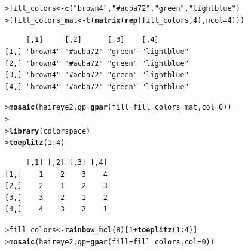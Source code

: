 \documentclass[10pt,krantz2]{krantz}\usepackage[]{graphicx}\usepackage[]{color}
\makeatletter
\newcommand{\hlnum}[1]{\textcolor[rgb]{0.686,0.059,0.569}{#1}}%
\newcommand{\hlstr}[1]{\textcolor[rgb]{0.192,0.494,0.8}{#1}}%
\newcommand{\hlopt}[1]{\textcolor[rgb]{0,0,0}{#1}}%
\newcommand{\hlstd}[1]{\textcolor[rgb]{0.345,0.345,0.345}{#1}}%
\newcommand{\hlkwb}[1]{\textcolor[rgb]{0.69,0.353,0.396}{#1}}%
\newcommand{\hlkwc}[1]{\textcolor[rgb]{0.333,0.667,0.333}{#1}}%
\newcommand{\hlkwd}[1]{\textcolor[rgb]{0.737,0.353,0.396}{\textbf{#1}}}%
\newenvironment{kframe}{%
 \def\at@end@of@kframe{}%
 \ifinner\ifhmode%
  \def\at@end@of@kframe{\end{minipage}}%
  \begin{minipage}{\columnwidth}%
 \fi\fi%
 \def\FrameCommand##1{\hskip\@totalleftmargin \hskip-\fboxsep
 \colorbox{shadecolor}{##1}\hskip-\fboxsep
     \hskip-\linewidth \hskip-\@totalleftmargin \hskip\columnwidth}%
 \MakeFramed {\advance\hsize-\width
   \@totalleftmargin\z@ \linewidth\hsize
   \@setminipage}}%
 {\par\unskip\endMakeFramed%
 \at@end@of@kframe}
\newenvironment{knitrout}{}{} %
\renewenvironment{knitrout}{\small\renewcommand{\baselinestretch}{.85}}{} %
\makeatother
\begin{document}
\begin{knitrout}
\color{fgcolor}\begin{kframe}
\begin{alltt}
\hlstd{> }\hlstd{fill_colors} \hlkwb{<-} \hlkwd{c}\hlstd{(}\hlstr{"brown4"}\hlstd{,} \hlstr{"#acba72"}\hlstd{,} \hlstr{"green"}\hlstd{,} \hlstr{"lightblue"}\hlstd{)}
\hlstd{> }\hlstd{(fill_colors_mat} \hlkwb{<-} \hlkwd{t}\hlstd{(}\hlkwd{matrix}\hlstd{(}\hlkwd{rep}\hlstd{(fill_colors,} \hlnum{4}\hlstd{),} \hlkwc{ncol}\hlstd{=}\hlnum{4}\hlstd{)))}
\end{alltt}
\begin{verbatim}
     [,1]     [,2]      [,3]    [,4]       
[1,] "brown4" "#acba72" "green" "lightblue"
[2,] "brown4" "#acba72" "green" "lightblue"
[3,] "brown4" "#acba72" "green" "lightblue"
[4,] "brown4" "#acba72" "green" "lightblue"
\end{verbatim}
\begin{alltt}
\hlstd{> }\hlkwd{mosaic}\hlstd{(haireye2,} \hlkwc{gp} \hlstd{=} \hlkwd{gpar}\hlstd{(}\hlkwc{fill} \hlstd{= fill_colors_mat,} \hlkwc{col} \hlstd{=} \hlnum{0}\hlstd{))}
\hlstd{> }
\hlstd{> }\hlkwd{library}\hlstd{(colorspace)}
\hlstd{> }\hlkwd{toeplitz}\hlstd{(}\hlnum{1}\hlopt{:}\hlnum{4}\hlstd{)}
\end{alltt}
\begin{verbatim}
     [,1] [,2] [,3] [,4]
[1,]    1    2    3    4
[2,]    2    1    2    3
[3,]    3    2    1    2
[4,]    4    3    2    1
\end{verbatim}
\begin{alltt}
\hlstd{> }\hlstd{fill_colors} \hlkwb{<-} \hlkwd{rainbow_hcl}\hlstd{(}\hlnum{8}\hlstd{)[}\hlnum{1}\hlopt{+}\hlkwd{toeplitz}\hlstd{(}\hlnum{1}\hlopt{:}\hlnum{4}\hlstd{)]}
\hlstd{> }\hlkwd{mosaic}\hlstd{(haireye2,} \hlkwc{gp} \hlstd{=} \hlkwd{gpar}\hlstd{(}\hlkwc{fill} \hlstd{= fill_colors,} \hlkwc{col} \hlstd{=} \hlnum{0}\hlstd{))}
\end{alltt}
\end{kframe}\begin{figure}[!htbp]


\end{figure}
\end{knitrout}
\end{document}
